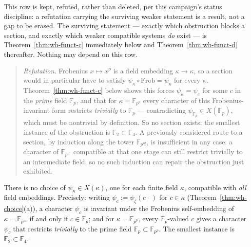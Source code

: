 \begin{scope}
This row is kept, refuted, rather than deleted, per this campaign's status
discipline: a refutation carrying the surviving weaker statement is a
result, not a gap to be erased. The surviving statement — exactly which
obstruction blocks a section, and exactly which weaker compatible systems
\emph{do} exist — is Theorem~\ref{thm:wh-funct-c} immediately below and
Theorem~\ref{thm:wh-funct-d} thereafter. Nothing may depend on this row.
\end{scope}


\begin{quote}
\emph{Refutation.} Frobenius $x\mapsto x^p$ is a field embedding
$\kappa\to\kappa$, so a section would in particular have to satisfy
$\psi_\kappa\circ\mathrm{Frob}=\psi_\kappa$ for every $\kappa$. Theorem~\ref{thm:wh-funct-c}
below shows this forces $\psi_\kappa=\psi_c$ for some $c$ in the \emph{prime}
field $\mathbb{F}_p$, and that for $\kappa=\mathbb{F}_{p^p}$ every character
of this Frobenius-invariant form restricts \emph{trivially} to
$\mathbb{F}_p$ — contradicting $\psi_{\mathbb{F}_p}\in X(\mathbb{F}_p)$,
which must be nontrivial by definition. So no section exists; the smallest
instance of the obstruction is $\mathbb{F}_2\subset\mathbb{F}_4$. A
previously considered route to a section, by induction along the tower
$\mathbb{F}_{p^{n!}}$, is insufficient in any case: a character of
$\mathbb{F}_{p^{n!}}$ compatible at that one stage can still restrict
trivially to an intermediate field, so no such induction can repair the
obstruction just exhibited.
\end{quote}

\statusProved
\begin{theorem}
\label{thm:wh-funct-c}
There is no choice of $\psi_\kappa\in X(\kappa)$, one for each finite field
$\kappa$, compatible with \emph{all} field embeddings. Precisely: writing
$\psi_c := \psi_\zeta(c\,\cdot)$ for $c\in\kappa$ (Theorem~\ref{thm:wh-choice}(a)),
a character $\psi_c$ is invariant under the Frobenius self-embedding of
$\kappa=\mathbb{F}_{p^m}$ if and only if $c\in\mathbb{F}_p$; and for
$\kappa=\mathbb{F}_{p^p}$, every $\mathbb{F}_p$-valued $c$ gives a character
$\psi_c$ that restricts \emph{trivially} to the prime field
$\mathbb{F}_p\subset\mathbb{F}_{p^p}$. The smallest instance is
$\mathbb{F}_2\subset\mathbb{F}_4$.
\end{theorem}

